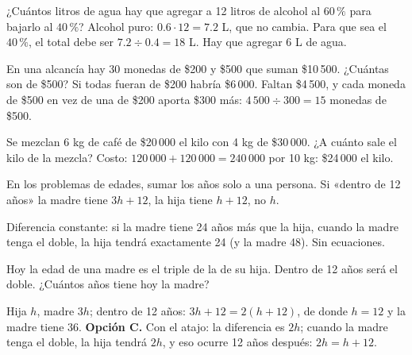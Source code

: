 \begin{ejemplo}
¿Cuántos litros de agua hay que agregar a 12 litros de alcohol al $60\,\%$ para bajarlo al $40\,\%$?
\solucion Alcohol puro: $0.6 \cdot 12 = 7.2$ L, que no cambia. Para que sea el $40\,\%$, el total debe ser
$7.2 \div 0.4 = 18$ L. Hay que agregar 6 L de agua.
\end{ejemplo}

\begin{ejemplo}
En una alcancía hay 30 monedas de \$200 y \$500 que suman \$10\,500. ¿Cuántas son de \$500?
\solucion Si todas fueran de \$200 habría \$6\,000. Faltan \$4\,500, y cada moneda de \$500 en vez de una de \$200 aporta
\$300 más: $4\,500 \div 300 = 15$ monedas de \$500.
\end{ejemplo}

\begin{ejemplo}[Café]
Se mezclan 6 kg de café de \$20\,000 el kilo con 4 kg de \$30\,000. ¿A cuánto sale el kilo de la mezcla?
\solucion Costo: $120\,000 + 120\,000 = 240\,000$ por 10 kg: \$24\,000 el kilo.
\end{ejemplo}

\begin{trampa}
En los problemas de edades, sumar los años solo a una persona. Si «dentro de 12 años» la madre tiene $3h + 12$, la hija
tiene $h + 12$, no $h$.
\end{trampa}

\begin{atajo}
Diferencia constante: si la madre tiene 24 años más que la hija, cuando la madre tenga el doble, la hija tendrá
exactamente 24 (y la madre 48). Sin ecuaciones.
\end{atajo}

\begin{reto}
Hoy la edad de una madre es el triple de la de su hija. Dentro de 12 años será el doble. ¿Cuántos años tiene hoy la
madre?
\end{reto}

\begin{retoresuelto}
Hija $h$, madre $3h$; dentro de 12 años: $3h + 12 = 2(h + 12)$, de donde $h = 12$ y la madre tiene 36.
\textbf{Opción C.} Con el atajo: la diferencia es $2h$; cuando la madre tenga el doble, la hija tendrá $2h$, y eso ocurre
12 años después: $2h = h + 12$.
\end{retoresuelto}

